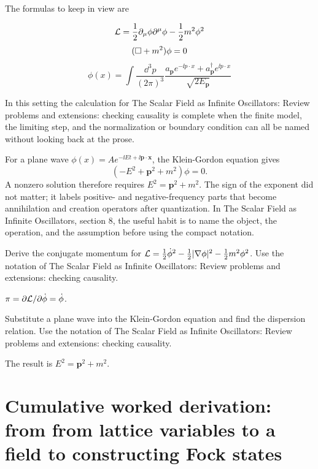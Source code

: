 The formulas to keep in view are

\[
  \mathcal L=\frac12\partial_\mu\phi\partial^\mu\phi-\frac12m^2\phi^2
\]
\[
  (\Box+m^2)\phi=0
\]
\[
  \phi(x)=\int\frac{\dd^3p}{(2\pi)^3}\frac{a_{\bm p}e^{-\ii p\cdot x}+a_{\bm p}^\dagger e^{\ii p\cdot x}}{\sqrt{2E_{\bm p}}}
\]

In this setting the calculation for The Scalar Field as Infinite Oscillators: Review problems and extensions: checking causality is complete when the finite model, the limiting step, and the normalization or boundary condition can all be named without looking back at the prose.




\begin{example}
For a plane wave \(\phi(x)=Ae^{-\ii Et+\ii\bm p\cdot\bm x}\), the Klein-Gordon equation gives
\[
  (-E^2+\bm p^2+m^2)\phi=0.
\]
A nonzero solution therefore requires \(E^2=\bm p^2+m^2\).  The sign of the exponent did not matter; it labels positive- and negative-frequency parts that become annihilation and creation operators after quantization.  In The Scalar Field as Infinite Oscillators, section 8, the useful habit is to name the object, the operation, and the assumption before using the compact notation.
\end{example}



\begin{exercise}
Derive the conjugate momentum for \(\mathcal L=\frac12\dot\phi^2-\frac12|\nabla\phi|^2-\frac12m^2\phi^2\).  Use the notation of The Scalar Field as Infinite Oscillators: Review problems and extensions: checking causality.
\begin{answer}
\(\pi=\partial\mathcal L/\partial\dot\phi=\dot\phi\).
\end{answer}
\end{exercise}

\begin{exercise}
Substitute a plane wave into the Klein-Gordon equation and find the dispersion relation.  Use the notation of The Scalar Field as Infinite Oscillators: Review problems and extensions: checking causality.
\begin{answer}
The result is \(E^2=\bm p^2+m^2\).
\end{answer}
\end{exercise}



\section{Cumulative worked derivation: from from lattice variables to a field to constructing Fock states}

